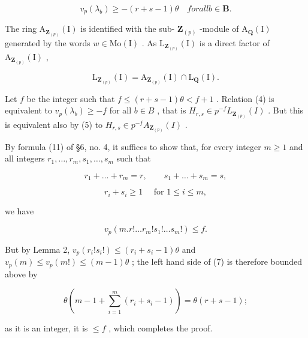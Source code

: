 \[
v _ {p} (\lambda_ {b}) \geqslant - (r + s - 1) \theta \quad for all b \in \mathbf {B}.\tag{4}
\]

The ring \(\mathrm{A}_{\mathbf{Z}_{(p)}}(\mathrm{I})\) is identified with the sub- \(\mathbf{Z}_{(p)}\) -module of \(\mathrm{A}_{\mathbf{Q}}(\mathrm{I})\) generated by the words \(w \in \mathrm{Mo}(\mathrm{I})\) . As \(\mathrm{L}_{\mathbf{Z}_{(p)}}(\mathrm{I})\) is a direct factor of \(\mathrm{A}_{\mathbf{Z}_{(p)}}(\mathrm{I})\) ,

\[
\mathrm{L} _ {\mathbf {Z} _ {(p)}} (\mathrm{I}) = \mathrm{A} _ {\mathbf {Z} _ {(p)}} (\mathrm{I}) \cap \mathrm{L} _ {\mathbf {Q}} (\mathrm{I}).\tag{5}
\]

Let \(f\) be the integer such that \(f \leqslant (r + s - 1)\theta < f + 1\) . Relation (4) is equivalent to \(v_{p}(\lambda_{b}) \geqslant -f\) for all \(b \in B\) , that is \(H_{r,s} \in p^{-f}L_{\mathbf{Z}_{(p)}}(I)\) . But this is equivalent also by (5) to \(H_{r,s} \in p^{-f}A_{\mathbf{Z}_{(p)}}(I)\) .

By formula (11) of §6, no. 4, it suffices to show that, for every integer \(m \geqslant 1\) and all integers \(r_1, \ldots, r_m, s_1, \ldots, s_m\) such that

\[
r _ {1} + \dots + r _ {m} = r, \qquad s _ {1} + \dots + s _ {m} = s,\tag{6}
\]

\[
r _ {i} + s _ {i} \geqslant 1 \quad \text { for } 1 \leqslant i \leqslant m,
\]

we have

\[
v _ {p} (m. r! \dots r _ {m}! s _ {1}! \dots s _ {m}!) \leqslant f.\tag{7}
\]

But by Lemma 2, \(v_{p}(r_{i}!s_{i}!) \leqslant (r_{i} + s_{i} - 1)\theta\) and \(v_{p}(m) \leqslant v_{p}(m!) \leqslant (m - 1)\theta\) ; the left hand side of (7) is therefore bounded above by

\[
\theta (m - 1 + \sum_ {i = 1} ^ {m} \left(r _ {i} + s _ {i} - 1\right)) = \theta (r + s - 1);
\]

as it is an integer, it is \(\leqslant f\) , which completes the proof.

